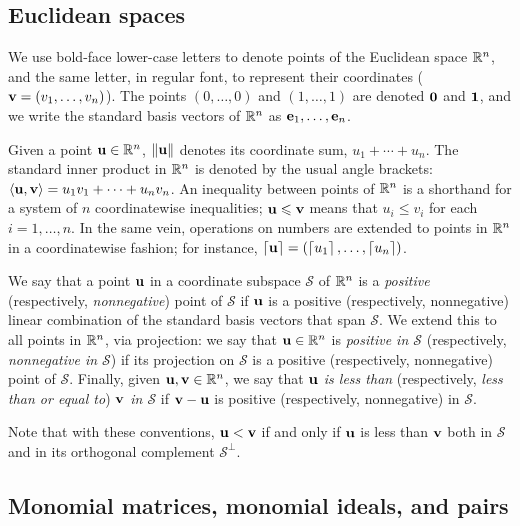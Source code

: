 \documentclass{amsart}
\begin{document}
\subsection{Euclidean spaces}
\label{ss: euclidean spaces and convexity}
We use bold-face lower-case letters to denote points of the Euclidean space $\mathbb{R}^n$, and the same letter, in regular font, to represent their coordinates (\eg $\mathbf{v}=(v_1,\ldots,v_n)$).
The points $(0,\ldots,0)$ and $(1,\ldots,1)$ are denoted $\mathbf{0}$ and $\mathbf{1}$, and we write the standard basis vectors of $\mathbb{R}^n$ as $\mathbf{e}_1,\ldots,\mathbf{e}_n$.

Given a point $\mathbf{u}\in \mathbb{R}^n$, $\| \mathbf{u} \|$ denotes its coordinate sum, $u_1+\cdots+u_n$.
The standard inner product in $\mathbb{R}^n$ is denoted by the usual angle brackets: $\langle \mathbf{u}, \mathbf{v} \rangle = u_1v_1 + \cdots + u_nv_n$.
An inequality between points of $\mathbb{R}^n$ is a shorthand for a system of $n$ coordinatewise inequalities; \eg $\mathbf{u}\leqslant \mathbf{v}$ means that $u_i \le v_i$ for each $i=1,\ldots,n$.
In the same vein, operations on numbers are extended to points in $\mathbb{R}^n$ in a coordinatewise fashion; for instance, $\left\lceil \mathbf{u} \right\rceil=(\left\lceil u_1 \right\rceil,\ldots,\left\lceil u_n \right\rceil)$.

We say that a point $\mathbf{u}$ in a coordinate subspace $\mathcal{S}$ of $\mathbb{R}^n$ is a \emph{positive} (respectively, \emph{nonnegative}) point of $\mathcal{S}$ if $\mathbf{u}$ is a positive (respectively, nonnegative) linear combination of the standard basis vectors that span $\mathcal{S}$.
We extend this to all points in $\mathbb{R}^n$, via projection: we say that $\mathbf{u} \in \mathbb{R}^n$ is \emph{positive in $\mathcal{S}$} (respectively, \emph{nonnegative in $\mathcal{S}$}) if its projection on $\mathcal{S}$ is a positive (respectively, nonnegative) point of $\mathcal{S}$.
Finally, given $\mathbf{u},\mathbf{v}\in \mathbb{R}^n$, we say that \emph{$\mathbf{u}$ is less than} (respectively, \emph{less than or equal to}) \emph{$\mathbf{v}$ in $\mathcal{S}$} if $\mathbf{v}-\mathbf{u}$ is positive (respectively, nonnegative) in $\mathcal{S}$.

Note that with these conventions, $\mathbf{u} < \mathbf{v}$ if and only if $\mathbf{u}$ is less than $\mathbf{v}$ both in $\mathcal{S}$ and in its orthogonal complement $\mathcal{S}^\perp$.

\subsection{Monomial matrices, monomial ideals, and pairs}
\label{monomial newton preliminaries: ss}
\end{document}
